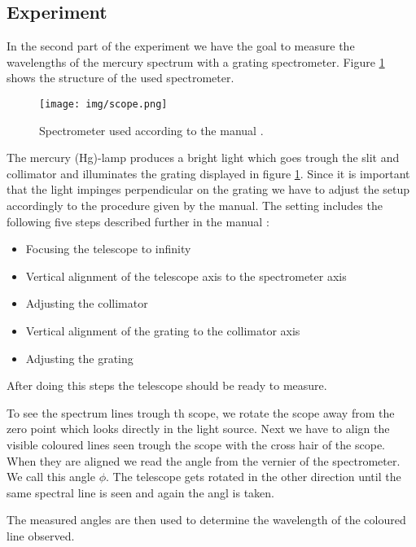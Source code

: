 \subsection{Experiment}
In the second part of the experiment we have the goal to measure the wavelengths of the mercury spectrum with a grating spectrometer.
Figure \ref{fig::scope} shows the structure of the used spectrometer. 
\begin{figure} [ht]
	\centering
	\texttt{[image: img/scope.png]}
	\caption{Spectrometer used according to the manual \cite{manual}.}
	\label{fig::scope}
\end{figure}

The mercury (Hg)-lamp produces a bright light which goes trough the slit and collimator and illuminates the grating displayed in figure \ref{fig::scope}.
Since it is important that the light impinges perpendicular on the grating we have to adjust the setup accordingly to the procedure given by the manual\cite{manual}.
The setting includes the following five steps described further in the manual \cite{manual}:
\begin{itemize}
	\item Focusing the telescope to infinity
	\item Vertical alignment of the telescope axis to the spectrometer axis
	\item Adjusting the collimator
	\item Vertical alignment of the grating to the collimator axis
	\item Adjusting the grating
\end{itemize}
After doing this steps the telescope should be ready to measure.

To see the spectrum lines trough th scope, we rotate the scope away from the zero point which looks directly in the light source.
Next we have to align the visible coloured lines seen trough the scope with the cross hair of the scope.
When they are aligned we read the angle from the vernier of the spectrometer.
We call this angle $\phi$.
The telescope gets rotated in the other direction until the same spectral line is seen and again the angl is taken.

The measured angles are then used to determine the wavelength of the coloured line observed.
 